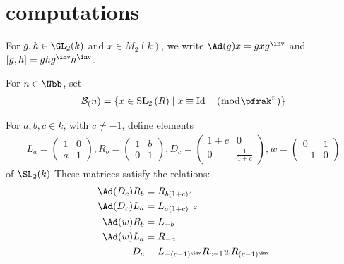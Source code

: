 \section*{computations}
For $g,h \in \GL_2(k)$ and $x \in M_2(k)$, we write $\Ad(g)x=gxg^\inv$ and $[g,h]=ghg^\inv h^\inv$.

For $n \in \Nbb$, set
\begin{align*}
  \mathcal{B}_(n)=\left\{x \in \mathrm{SL}_2\left(R\right) \mid x \equiv \operatorname{Id} \quad\left(\bmod \pfrak^n\right)\right\}
\end{align*}

For $a,b,c \in k$, with $c\neq -1$,  define elements
\begin{align*}
  L_a=\left(\begin{array}{ll}
              1 & 0 \\
              a & 1
            \end{array}\right), R_b=\left(\begin{array}{ll}
                                            1 & b \\
                                            0 & 1
                                          \end{array}\right), D_c=\left(\begin{array}{cc}
                                                                          1+c & 0             \\
                                                                          0   & \frac{1}{1+c}
                                                                        \end{array}\right), w=\left(\begin{array}{rr}
                                                                                                      0  & 1 \\
                                                                                                      -1 & 0
                                                                                                    \end{array}\right)
\end{align*}
of $\SL_2(k)$ These matrices satisfy the relations:
\begin{align*}
  \Ad(D_c)R_b & =R_{b(1+c)^2}                            \\
  \Ad(D_c)L_a & =L_{a(1+c)^{-2}}                         \\
  \Ad(w)R_b   & = L_{-b}                                 \\
  \Ad(w)L_a   & = R_{-a}                                 \\
  D_c         & = L_{-(c-1)^\inv}R_{c-1}w R_{(c-1)^\inv}
\end{align*}




